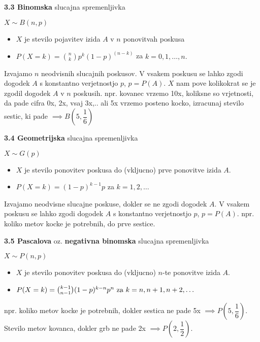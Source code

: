 \documentclass{article}
\begin{document}
\begin{multicols}{3}
\textbf{3.3 Binomska} slucajna spremenljivka
\begin{center}
    \begin{math}
        X \sim B(n, p)
    \end{math}
\end{center}
\begin{itemize}
    \item $X$ je stevilo pojavitev izida $A$ v $n$ ponovitvah poskusa
    \item $P(X = k) = {n \choose k} p^{k} (1 - p)^{(n - k)}$ za $k = 0,1, \dots, n.$
\end{itemize}
Izvajamo $n$ neodvisnih slucajnih poskusov. V vsakem poskusu se lahko zgodi dogodek $A$ s 
konstantno verjetnostjo $p$, $p =  P(A)$. 
$X$ nam pove kolikokrat se je zgodil dogodek $A$ v $n$ poskusih.
npr. kovanec vrzemo 10x, koliksne so vrjetnosti, da pade cifra 0x, 2x, vsaj 3x,..
ali 5x vrzemo posteno kocko, izracunaj stevilo sestic, ki pade $\implies B(5, \dfrac{1}{6})$

\textbf{3.4 Geometrijska} slucajna spremenljivka
\begin{center}
    \begin{math}
        X \sim G(p)
    \end{math}
\end{center}
\begin{itemize}
    \item $X$ je stevilo ponovitev poskusa do (vkljucno) prve ponovitve izida $A$.
    \item $P(X = k) = (1 - p)^{k - 1} p$ za $k = 1,2, \dots$ %
\end{itemize}
Izvajamo  neodvisne slucajne poskuse, dokler se ne zgodi dogodek $A$. V vsakem poskusu
se lahko zgodi dogodek $A$  s konstantno verjetnostjo $p$, $p =  P(A)$.
npr. koliko metov kocke je potrebnih, do prve sestice.

\textbf{3.5 Pascalova} oz. \textbf{negativna binomska} slucajna spremenljivka
\begin{center}
    \begin{math}
        X \sim P(n, p)
    \end{math}
\end{center}
\begin{itemize}
    \item $X$ je stevilo ponovitev poskusa do (vkljucno) $n$-te ponovitve izida $A$.
    \item \begin{math}
        P(X = k) = {k - 1 \choose n - 1 }(1 - p)^{k - n} p^{n} $ za $ k = n, n + 1, n + 2, \dots
    \end{math}
\end{itemize}
npr. koliko metov kocke je potrebnih, dokler sestica ne pade 5x $\implies P(5, \dfrac{1}{6})$. Stevilo metov kovanca,
dokler grb ne pade 2x $\implies P(2, \dfrac{1}{2})$.


\end{multicols}
\end{document}
